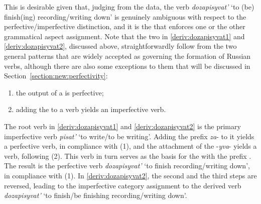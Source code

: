 This is desirable given that, judging from the data, the verb \textit{dozapisyvat'} `to (be) finish(ing) recording/writing down' is genuinely ambiguous with respect to the perfective/imperfective distinction, and it is the  that enforces one or the other grammatical aspect assignment. Note that the two  in \ref{deriv:dozapisyvat1} and \ref{deriv:dozapisyvat2}, discussed above, straightforwardly follow from the two general patterns that are widely accepted as governing the formation of Russian verbs, although there are also some exceptions to them that will be discussed in Section~\ref{section:new:perfectivity}:

\begin{enumerate}
\item the output of a  is perfective;   
\item adding the  to a verb yields an imperfective verb. 
\end{enumerate}

The root verb in \ref{deriv:dozapisyvat1} and \ref{deriv:dozapisyvat2} is the primary imperfective verb \textit{pisat'} `to write/to be writing'. Adding the prefix \textit{za}- to it yields a perfective verb, in compliance with (1), and the attachment of the  -\textit{yva}- yields a  verb, following (2). This verb in turn serves as the basis for the  with the  prefix . The result is the perfective verb \textit{dozapisyvat'} `to finish recording/writing down', in compliance with (1).  In \ref{deriv:dozapisyvat2}, the second and the third steps are reversed, leading to the imperfective category assignment to the derived verb \textit{dozapisyvat'} `to finish/be finishing recording/writing down'.

